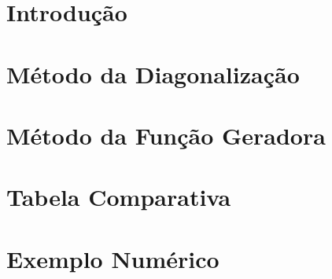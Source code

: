 \documentclass[a4paper, 11pt]{report}
\begin{document}
  

  \tableofcontents

  \chapter{Introdução}
    

  \chapter{Método da Diagonalização}
    

  \chapter{Método da Função Geradora}
    

  \chapter{Tabela Comparativa}
    

  \chapter{Exemplo Numérico}
    

  \nocite{*}
  \printbibliography[heading=bibintoc]
\end{document}
